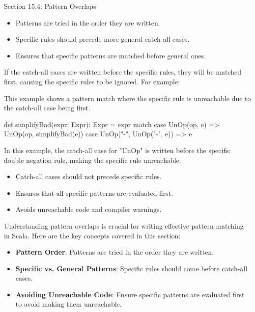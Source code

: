 \begin{notes}{Section 15.4: Pattern Overlaps}
\begin{highlight}
        \begin{itemize}
            \item Patterns are tried in the order they are written.
            \item Specific rules should precede more general catch-all cases.
            \item Ensures that specific patterns are matched before general ones.
        \end{itemize}
    
    \end{highlight}
    
    If the catch-all cases are written before the specific rules, they will be matched first, causing the specific rules to be ignored. For example:
    
    \begin{highlight}
    
        This example shows a pattern match where the specific rule is unreachable due to the catch-all case being first.
    
    \begin{code}[Scala]
    def simplifyBad(expr: Expr): Expr = expr match {
        case UnOp(op, e) => UnOp(op, simplifyBad(e))
        case UnOp("-", UnOp("-", e)) => e
    }
    \end{code}
    
        In this example, the catch-all case for "UnOp" is written before the specific double negation rule, making the specific rule unreachable.
    
        \begin{itemize}
            \item Catch-all cases should not precede specific rules.
            \item Ensures that all specific patterns are evaluated first.
            \item Avoids unreachable code and compiler warnings.
        \end{itemize}
    
    \end{highlight}
    
    \begin{highlight}
    
        Understanding pattern overlaps is crucial for writing effective pattern matching in Scala. Here are the key concepts covered in this section:
        
        \begin{itemize}
            \item \textbf{Pattern Order}: Patterns are tried in the order they are written.
            \item \textbf{Specific vs. General Patterns}: Specific rules should come before catch-all cases.
            \item \textbf{Avoiding Unreachable Code}: Ensure specific patterns are evaluated first to avoid making them unreachable.
        \end{itemize}
        

\end{highlight}
\end{notes}
